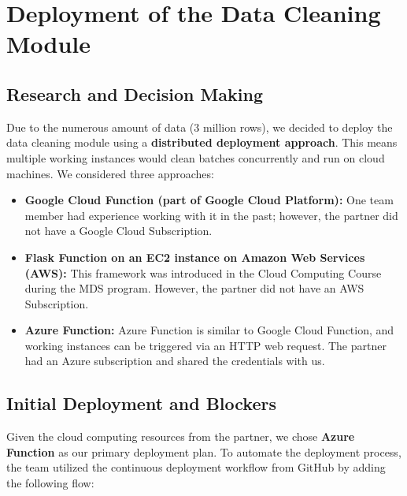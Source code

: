 \documentclass[
  11pt,
  a4paper,
  DIV=11,
  numbers=noendperiod]{scrartcl}
\providecommand{\tightlist}{%
  \setlength{\itemsep}{0pt}\setlength{\parskip}{0pt}}\usepackage{longtable,booktabs,array}
\begin{document}
\section{Deployment of the Data Cleaning
Module}\label{deployment-of-the-data-cleaning-module}

\subsection{Research and Decision
Making}\label{research-and-decision-making}

Due to the numerous amount of data (3 million rows), we decided to
deploy the data cleaning module using a \textbf{distributed deployment
approach}. This means multiple working instances would clean batches
concurrently and run on cloud machines. We considered three approaches:

\begin{itemize}
\tightlist
\item
  \textbf{Google Cloud Function (part of Google Cloud Platform):} One
  team member had experience working with it in the past; however, the
  partner did not have a Google Cloud Subscription.
\item
  \textbf{Flask Function on an EC2 instance on Amazon Web Services
  (AWS):} This framework was introduced in the Cloud Computing Course
  during the MDS program. However, the partner did not have an AWS
  Subscription.
\item
  \textbf{Azure Function:} Azure Function is similar to Google Cloud
  Function, and working instances can be triggered via an HTTP web
  request. The partner had an Azure subscription and shared the
  credentials with us.
\end{itemize}

\subsection{Initial Deployment and
Blockers}\label{initial-deployment-and-blockers}

Given the cloud computing resources from the partner, we chose
\textbf{Azure Function} as our primary deployment plan. To automate the
deployment process, the team utilized the continuous deployment workflow
from GitHub by adding the following flow:
\end{document}
